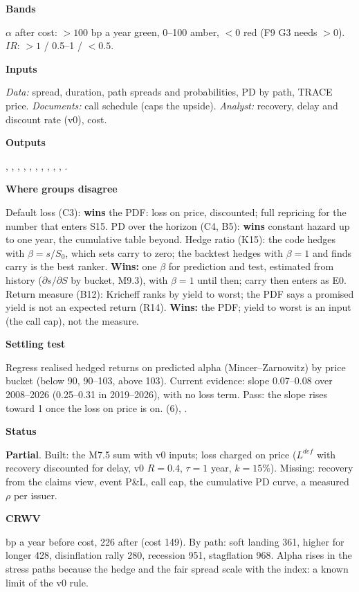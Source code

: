 \documentclass[11pt]{article}
\newcommand{\stpartial}{\textcolor{warn}{\textbf{Partial}}}
\newcommand{\fld}[1]{\par\medskip\noindent\textbf{\textcolor{steel}{#1}}\par\nopagebreak}
\begin{document}
\fld{Bands} $\alpha$ after cost: $>100$ bp a year green, 0--100 amber, $<0$ red (F9 G3 needs $>0$). $IR$: $>1$ / 0.5--1 / $<0.5$.

\fld{Inputs} \emph{Data:} spread, duration, path spreads and probabilities, PD by path, TRACE price. \emph{Documents:} call schedule (caps the upside). \emph{Analyst:} recovery, delay and discount rate (v0), cost.

\fld{Outputs} , , , , , , , , , , .

\fld{Where groups disagree} Default loss (C3): \textbf{wins} the PDF: loss on price, discounted; full repricing for the number that enters S15. PD over the horizon (C4, B5): \textbf{wins} constant hazard up to one year, the cumulative table beyond. Hedge ratio (K15): the code hedges with $\beta = s/S_0$, which sets carry to zero; the backtest hedges with $\beta = 1$ and finds carry is the best ranker. \textbf{Wins:} one $\beta$ for prediction and test, estimated from history ($\partial s/\partial S$ by bucket, M9.3), with $\beta=1$ until then; carry then enters as E0. Return measure (B12): Kricheff ranks by yield to worst; the PDF says a promised yield is not an expected return (R14). \textbf{Wins:} the PDF; yield to worst is an input (the call cap), not the measure.

\fld{Settling test} Regress realised hedged returns on predicted alpha (Mincer--Zarnowitz) by price bucket (below 90, 90--103, above 103). Current evidence: slope 0.07--0.08 over 2008--2026 (0.25--0.31 in 2019--2026), with no loss term. Pass: the slope rises toward 1 once the loss on price is on.  (6), .

\fld{Status} \stpartial. Built: the M7.5 sum with v0 inputs; loss charged on price ($L^{def}$ with recovery discounted for delay, v0 $R = 0.4$, $\tau = 1$ year, $k = 15\%$). Missing: recovery from the claims view, event P\&L, call cap, the cumulative PD curve, a measured $\rho$ per issuer.

\fld{CRWV} 376 bp a year before cost, 226 after (cost 149). By path: soft landing 361, higher for longer 428, disinflation rally 280, recession 951, stagflation 968. Alpha rises in the stress paths because the hedge and the fair spread scale with the index: a known limit of the v0 rule.
\end{document}
